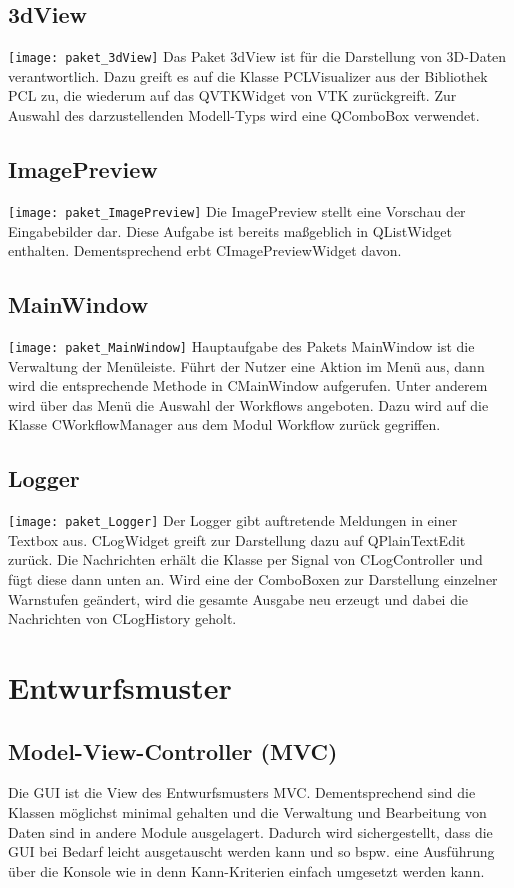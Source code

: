 \subsection{3dView}
\texttt{[image: paket\_3dView]}
Das Paket 3dView ist für die Darstellung von 3D-Daten verantwortlich. Dazu greift es auf die Klasse PCLVisualizer aus der Bibliothek PCL zu, die wiederum auf das QVTKWidget von VTK zurückgreift. Zur Auswahl des darzustellenden Modell-Typs wird eine QComboBox verwendet.

\subsection{ImagePreview}
\texttt{[image: paket\_ImagePreview]}
Die ImagePreview stellt eine Vorschau der Eingabebilder dar. Diese Aufgabe ist bereits maßgeblich in QListWidget enthalten. Dementsprechend erbt CImagePreviewWidget davon.

\subsection{MainWindow}
\texttt{[image: paket\_MainWindow]}
Hauptaufgabe des Pakets MainWindow ist die Verwaltung der Menüleiste. Führt der Nutzer eine Aktion im Menü aus, dann wird die entsprechende Methode in CMainWindow aufgerufen. Unter anderem wird über das Menü die Auswahl der Workflows angeboten. Dazu wird auf die Klasse CWorkflowManager aus dem Modul Workflow zurück gegriffen.

\subsection{Logger}
\texttt{[image: paket\_Logger]}
Der Logger gibt auftretende Meldungen in einer Textbox aus. CLogWidget greift zur Darstellung dazu auf QPlainTextEdit zurück. Die Nachrichten erhält die Klasse per Signal von CLogController und fügt diese dann unten an. Wird eine der ComboBoxen zur Darstellung einzelner Warnstufen geändert, wird die gesamte Ausgabe neu erzeugt und dabei die Nachrichten von CLogHistory geholt.

\section{Entwurfsmuster}
\subsection{Model-View-Controller (MVC)}
Die GUI ist die View des Entwurfsmusters MVC. Dementsprechend sind die Klassen möglichst minimal gehalten und die Verwaltung und Bearbeitung von Daten sind in andere Module ausgelagert. Dadurch wird sichergestellt, dass die GUI bei Bedarf leicht ausgetauscht werden kann und so bspw. eine Ausführung über die Konsole wie in denn Kann-Kriterien einfach umgesetzt werden kann.

